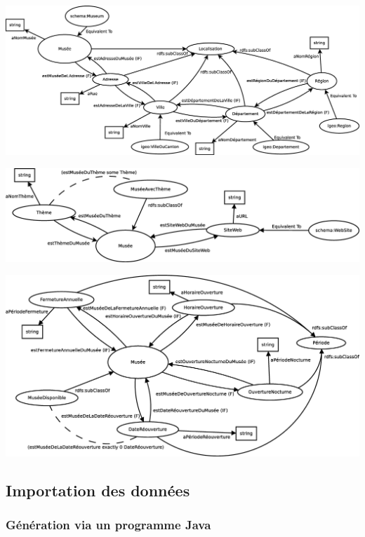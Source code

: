 \documentclass{article}
\begin{document}
\begin{center}
\includegraphics[width=16cm]{Diagramme1.eps}
\end{center}
\vspace{0.3cm}
\begin{center}
\includegraphics[width=16cm]{Diagramme2.eps}
\end{center}
\vspace{0.3cm}
\begin{center}
\includegraphics[width=16cm]{Diagramme3.eps}
\end{center}

\subsection{Importation des données}

\subsubsection{Génération via un programme Java}
\end{document}
